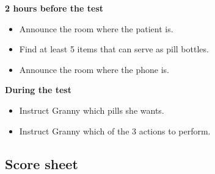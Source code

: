 \textbf{2 hours before the test}
\begin{itemize}
	\item Announce the room where the patient is.
	\item Find at least 5 items that can serve as pill bottles.
	\item Announce the room where the phone is.
\end{itemize}

\textbf{During the test}
\begin{itemize}
	\item Instruct Granny which pills she wants.
	\item Instruct Granny which of the 3 actions to perform.
\end{itemize}

\newpage 
\subsection{Score sheet}



